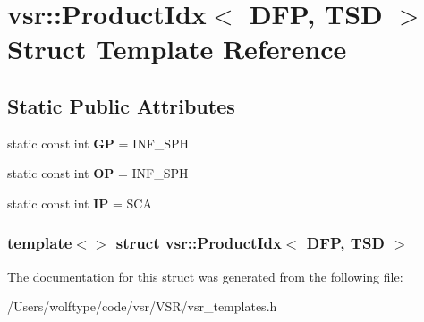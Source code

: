 \hypertarget{structvsr_1_1_product_idx_3_01_d_f_p_00_01_t_s_d_01_4}{\section{vsr\-:\-:Product\-Idx$<$ D\-F\-P, T\-S\-D $>$ Struct Template Reference}
\label{structvsr_1_1_product_idx_3_01_d_f_p_00_01_t_s_d_01_4}
}
\subsection*{Static Public Attributes}
\begin{DoxyCompactItemize}
\item 
\hypertarget{structvsr_1_1_product_idx_3_01_d_f_p_00_01_t_s_d_01_4_a6509b6c5bf205d1c49a99e3cac7bf23d}{static const int {\bfseries G\-P} = I\-N\-F\-\_\-\-S\-P\-H}\label{structvsr_1_1_product_idx_3_01_d_f_p_00_01_t_s_d_01_4_a6509b6c5bf205d1c49a99e3cac7bf23d}

\item 
\hypertarget{structvsr_1_1_product_idx_3_01_d_f_p_00_01_t_s_d_01_4_a830eedfe0abaf0eaaac7b2fd3291b0df}{static const int {\bfseries O\-P} = I\-N\-F\-\_\-\-S\-P\-H}\label{structvsr_1_1_product_idx_3_01_d_f_p_00_01_t_s_d_01_4_a830eedfe0abaf0eaaac7b2fd3291b0df}

\item 
\hypertarget{structvsr_1_1_product_idx_3_01_d_f_p_00_01_t_s_d_01_4_a60d8db659b676ff89d71377057352f41}{static const int {\bfseries I\-P} = S\-C\-A}\label{structvsr_1_1_product_idx_3_01_d_f_p_00_01_t_s_d_01_4_a60d8db659b676ff89d71377057352f41}

\end{DoxyCompactItemize}
\subsubsection*{template$<$$>$ struct vsr\-::\-Product\-Idx$<$ D\-F\-P, T\-S\-D $>$}



The documentation for this struct was generated from the following file\-:\begin{DoxyCompactItemize}
\item 
/\-Users/wolftype/code/vsr/\-V\-S\-R/vsr\-\_\-templates.\-h\end{DoxyCompactItemize}
